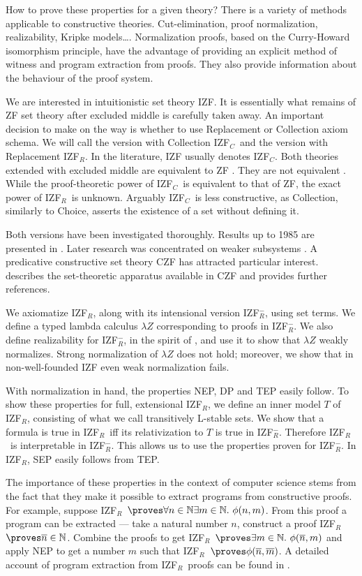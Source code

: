 \documentclass{LMCS}
\newcommand{\ov}[1]{\ensuremath{\overline{#1}}}
\newcommand{\nat}{\ensuremath{\mathbb{N}}}
\newcommand{\p}{\proves}
\newcommand{\izfc}{IZF${}_C$}
\newcommand{\izfr}{IZF${}_R$}
\newcommand{\iizfr}{IZF${}_R^{-}$}
\newcommand{\li}{\lambda Z}
\begin{document}
How to prove these properties for a given theory? There is a variety of
methods applicable to constructive theories. Cut-elimination, proof
normalization, realizability, Kripke models{\ldots}.
Normalization proofs, based on the Curry-Howard isomorphism principle, have the advantage of
providing an explicit method of witness and program extraction from
proofs. They also provide information about the behaviour of the proof
system. 

We are interested in intuitionistic set theory IZF. It is essentially what 
remains of ZF set theory after excluded middle is carefully taken away. An important 
decision to make on the way is whether to use Replacement or Collection axiom schema. 
We will call the version with Collection \izfc\  and the version with Replacement \izfr. In the literature,
IZF usually denotes \izfc. Both theories extended with excluded middle are
equivalent to ZF \cite{friedmancons}. They are not equivalent \cite{frsce3}.
While the proof-theoretic power of \izfc\ is equivalent to that of ZF, the exact
power of \izfr\ is unknown. Arguably \izfc\ is less constructive, as
Collection, similarly to Choice, asserts the existence of a set without
defining it. 

Both versions have been investigated thoroughly. Results up to 1985 are
presented in \cite{beesonbook,scedrov85}. Later research was concentrated on
weaker subsystems \cite{ar,ikp}. A predicative constructive set theory CZF has attracted
particular interest. \cite{ar} describes the set-theoretic apparatus
available in CZF and provides further references.

We axiomatize \izfr, along with its intensional version \iizfr, using set
terms. We define a typed lambda calculus $\li$ corresponding to proofs in
\iizfr. We also define realizability for \iizfr, in the spirit of
\cite{mccarty}, and use it to show that $\li$ weakly normalizes. Strong normalization of $\li$ does not hold; moreover, we show
that in non-well-founded IZF even weak normalization fails.

With normalization in hand, the properties NEP, DP and TEP
easily follow. To show these properties for full, extensional \izfr, we define an inner
model $T$ of \izfr, consisting of what we call transitively L-stable sets.
We show that a formula is true in \izfr\ iff its relativization to $T$ is true
in \iizfr. Therefore \izfr\ is interpretable in \iizfr. This allows us to use 
the properties proven for \iizfr. In \izfr, SEP easily follows from TEP. 

The importance of these properties in the context of computer science stems
from the fact that they make it possible to extract programs from
constructive proofs. For example, suppose \izfr\ $\p \forall n \in \nat
\exists m \in \nat.\ \phi(n, m)$. From this proof a program can be extracted --- 
take a natural number $n$, construct a proof \izfr\ $\p \ov{n}\in \nat$. Combine the proofs to get \izfr\ $ \p \exists m \in \nat.\ \phi(\ov{n}, m)$ and apply 
NEP to get a number $m$ such that \izfr\ $\p \phi(\ov{n}, \ov{m})$. A
detailed account of program extraction from \izfr\ proofs can be found in \cite{chol}.
\end{document}
